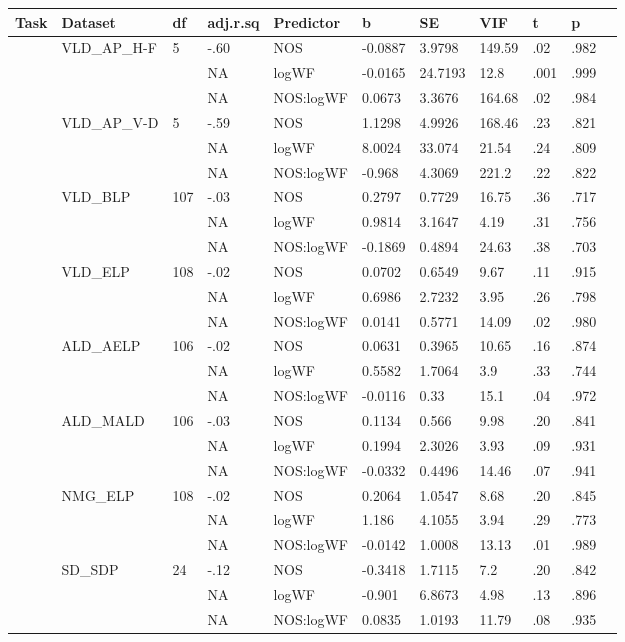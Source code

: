 \begin{table}[ht]
\centering
\begingroup\normalsize
\begin{tabular}{lllllllllll}
  \hline
Task & Dataset & df & adj.r.sq & Predictor & b & SE & VIF & t & p &  \\ 
  \hline
 & VLD\_AP\_H-F & 5 & -.60 & NOS & -0.0887 & 3.9798 & 149.59 & .02 & .982 &   \\ 
   &  &  & NA & logWF & -0.0165 & 24.7193 & 12.8 & .001 & .999 &   \\ 
   &  &  & NA & NOS:logWF & 0.0673 & 3.3676 & 164.68 & .02 & .984 &   \\ 
   & VLD\_AP\_V-D & 5 & -.59 & NOS & 1.1298 & 4.9926 & 168.46 & .23 & .821 &   \\ 
   &  &  & NA & logWF & 8.0024 & 33.074 & 21.54 & .24 & .809 &   \\ 
   &  &  & NA & NOS:logWF & -0.968 & 4.3069 & 221.2 & .22 & .822 &   \\ 
   & VLD\_BLP & 107 & -.03 & NOS & 0.2797 & 0.7729 & 16.75 & .36 & .717 &   \\ 
   &  &  & NA & logWF & 0.9814 & 3.1647 & 4.19 & .31 & .756 &   \\ 
   &  &  & NA & NOS:logWF & -0.1869 & 0.4894 & 24.63 & .38 & .703 &   \\ 
   & VLD\_ELP & 108 & -.02 & NOS & 0.0702 & 0.6549 & 9.67 & .11 & .915 &   \\ 
   &  &  & NA & logWF & 0.6986 & 2.7232 & 3.95 & .26 & .798 &   \\ 
   &  &  & NA & NOS:logWF & 0.0141 & 0.5771 & 14.09 & .02 & .980 &   \\ 
   & ALD\_AELP & 106 & -.02 & NOS & 0.0631 & 0.3965 & 10.65 & .16 & .874 &   \\ 
   &  &  & NA & logWF & 0.5582 & 1.7064 & 3.9 & .33 & .744 &   \\ 
   &  &  & NA & NOS:logWF & -0.0116 & 0.33 & 15.1 & .04 & .972 &   \\ 
   & ALD\_MALD & 106 & -.03 & NOS & 0.1134 & 0.566 & 9.98 & .20 & .841 &   \\ 
   &  &  & NA & logWF & 0.1994 & 2.3026 & 3.93 & .09 & .931 &   \\ 
   &  &  & NA & NOS:logWF & -0.0332 & 0.4496 & 14.46 & .07 & .941 &   \\ 
   & NMG\_ELP & 108 & -.02 & NOS & 0.2064 & 1.0547 & 8.68 & .20 & .845 &   \\ 
   &  &  & NA & logWF & 1.186 & 4.1055 & 3.94 & .29 & .773 &   \\ 
   &  &  & NA & NOS:logWF & -0.0142 & 1.0008 & 13.13 & .01 & .989 &   \\ 
   & SD\_SDP & 24 & -.12 & NOS & -0.3418 & 1.7115 & 7.2 & .20 & .842 &   \\ 
   &  &  & NA & logWF & -0.901 & 6.8673 & 4.98 & .13 & .896 &   \\ 
   &  &  & NA & NOS:logWF & 0.0835 & 1.0193 & 11.79 & .08 & .935 &   \\ 
   \hline
\end{tabular}
\endgroup
\end{table}
